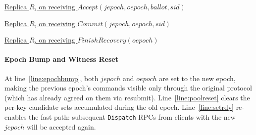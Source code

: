 \documentclass[twocolumn]{article}
\begin{document}
\begin{algorithm}
\caption{Server -- $OnAccept$}
\label{alg:on_accept}
\setcounter{AlgoLine}{109}

\underline{Replica $R$, on receiving $Accept(jepoch, oepoch, ballot, sid)$}\\
\end{algorithm}


\begin{algorithm}
\caption{Server -- $OnCommit$ and $OnFinishRecovery$}
\label{alg:on_commit_finish}
\setcounter{AlgoLine}{120}

\underline{Replica $R$, on receiving $Commit(jepoch, oepoch, sid)$}\\

\vskip 6pt

\underline{Replica $R$, on receiving $FinishRecovery(oepoch)$}\\
\end{algorithm}

\paragraph{Epoch Bump and Witness Reset}
At line~\ref{line:epochbump}, both $jepoch$ and $oepoch$ are set to the new epoch, making the previous epoch's commands visible only through the original protocol (which has already agreed on them via resubmit). Line~\ref{line:poolreset} clears the per-key candidate sets accumulated during the old epoch. Line~\ref{line:setrdy} re-enables the fast path: subsequent \texttt{Dispatch} RPCs from clients with the new $jepoch$ will be accepted again.
\end{document}
